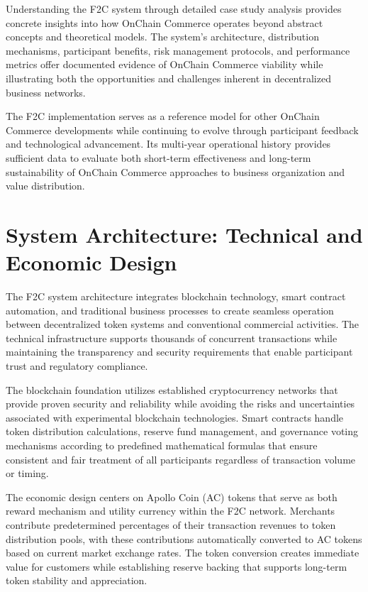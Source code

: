 \documentclass[
  Letterpaper,
]{scrbook}
\begin{document}
Understanding the F2C system through detailed case study analysis
provides concrete insights into how OnChain Commerce operates beyond
abstract concepts and theoretical models. The system's architecture,
distribution mechanisms, participant benefits, risk management
protocols, and performance metrics offer documented evidence of OnChain
Commerce viability while illustrating both the opportunities and
challenges inherent in decentralized business networks.

The F2C implementation serves as a reference model for other OnChain
Commerce developments while continuing to evolve through participant
feedback and technological advancement. Its multi-year operational
history provides sufficient data to evaluate both short-term
effectiveness and long-term sustainability of OnChain Commerce
approaches to business organization and value distribution.

\section{System Architecture: Technical and Economic
Design}\label{system-architecture-technical-and-economic-design}

The F2C system architecture integrates blockchain technology, smart
contract automation, and traditional business processes to create
seamless operation between decentralized token systems and conventional
commercial activities. The technical infrastructure supports thousands
of concurrent transactions while maintaining the transparency and
security requirements that enable participant trust and regulatory
compliance.

The blockchain foundation utilizes established cryptocurrency networks
that provide proven security and reliability while avoiding the risks
and uncertainties associated with experimental blockchain technologies.
Smart contracts handle token distribution calculations, reserve fund
management, and governance voting mechanisms according to predefined
mathematical formulas that ensure consistent and fair treatment of all
participants regardless of transaction volume or timing.

The economic design centers on Apollo Coin (AC) tokens that serve as
both reward mechanism and utility currency within the F2C network.
Merchants contribute predetermined percentages of their transaction
revenues to token distribution pools, with these contributions
automatically converted to AC tokens based on current market exchange
rates. The token conversion creates immediate value for customers while
establishing reserve backing that supports long-term token stability and
appreciation.
\end{document}
